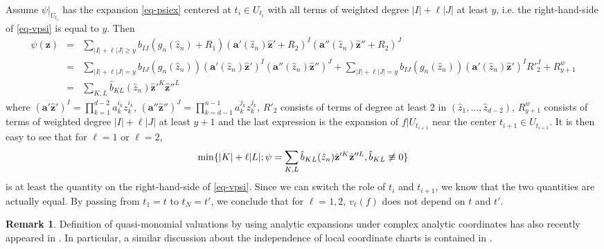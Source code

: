 \documentclass[12pt]{amsart}
\theoremstyle{definition}
\newtheorem{rmk}[thm]{Remark}
\def\min{{\rm min}}
\def\bz{{\mathbf{z}}}
\begin{document}
Assume $\psi|_{U_{t_i}}$ has the expansion \eqref{eq-psiex} centered at $t_i\in U_{t_i}$ with all terms of weighted degree $|I|+\ell|J|$ at least $y$, i.e. the right-hand-side of \eqref{eq-vpsi} is equal to $y$. 
Then
\begin{eqnarray*}
    \psi(\bz)%
    &=&\sum_{|I|+\ell |J|\ge y} b_{IJ}(g_n(\hat{z}_n)+R_1) (\mathbf{a}'(\hat{z}_n)\hat{\bz}'+R_2)^I (\mathbf{a}''(\hat{z}_n) \hat{\bz}''+R_2)^J\\
    &=&\sum_{|I|+\ell |J|=y} b_{IJ}(g_n(\hat{z}_n))(\mathbf{a}'(\hat{z}_n)\hat{\bz}')^I (\mathbf{a}''(\hat{z}_n)\hat{\bz}'')^J+\sum_{|I|+\ell|J|=y}b_{IJ}(g_n(\hat{z}_n))(\mathbf{a}'(\hat{z}_n)\hat{\bz}')^I  R'^J_2+R^w_{y+1}\\
   &=& \sum_{K,L}\hat{b}_{KL}(\hat{z}_n) \hat{\bz}'^K\hat{\bz}''^L
\end{eqnarray*}
where $(\mathbf{a}'\hat{\mathbf{z}}')^I=\prod_{k=1}^{d-2} a_k^{i_k}z_k^{i_k}$,
$(\mathbf{a}''\hat{\mathbf{z}}'')^J=\prod_{k=d-1}^{n-1} a_k^{j_k}z_k^{j_k}$, $R'_2$ consists of terms of degree at least $2$ in $(\hat{z}_1,\dots, \hat{z}_{d-2})$, $R^w_{y+1}$ consists of terms of weighted degree $|I|+\ell |J|$ at least $y+1$ and the last expression is the expansion of $f|U_{t_{i+1}}$ near the center $t_{i+1}\in U_{t_{i+1}}$. 
It is then easy to see that for $\ell=1$ or $\ell=2$,
\begin{equation*}
\min\{|K|+\ell |L|; \psi=\sum_{K, L}\hat{b}_{KL}(\hat{z}_n) \hat{\bz}'^K \hat{\bz}''^L, \hat{b}_{KL}\not\equiv 0\}
\end{equation*}
is at least the quantity on the right-hand-side of \eqref{eq-vpsi}. Since we can switch the role of $t_i$ and $t_{i+1}$, we know that the two quantities are actually equal. By passing from $t_1=t$ to $t_N=t'$, we conclude that for $\ell=1,2$, $v_\ell(f)$ does not depend on $t$ and $t'$. 

\begin{rmk}
    Definition of quasi-monomial valuations by using analytic expansions under complex analytic coordinates has also recently appeared in \cite[2.3.1]{MP24}. In particular, a similar discussion about the independence of local coordinate charts is contained in \cite[Proposition 2.3.4]{MP24}.
\end{rmk}
\end{document}
